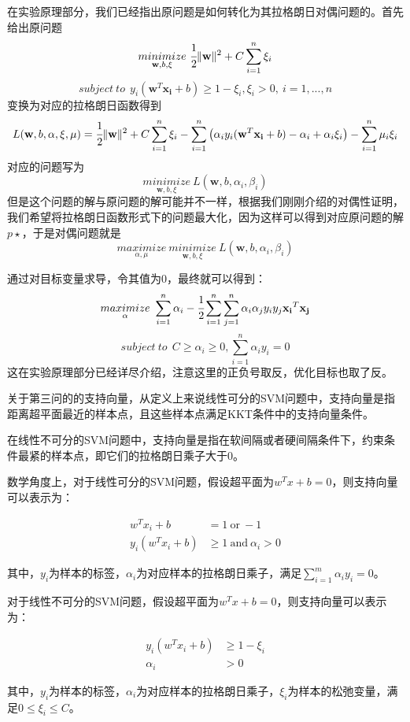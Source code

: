 \documentclass{article}
\begin{document}
在实验原理部分，我们已经指出原问题是如何转化为其拉格朗日对偶问题的。首先给出原问题
$$\underset{\mathbf{w},b,\xi}{minimize} \ \cfrac{1}{2} \lVert \mathbf{w} \rVert^2+C\sum_{i=1}^{n}\xi_i$$
$$ subject\ to\ \  y_i(\mathbf{w}^T\mathbf{x_i}+b)\geq1-\xi_i, \xi_i>0,\ i =1,...,n$$
变换为对应的拉格朗日函数得到
$$L(\mathbf{w},b,\alpha,\xi,\mu)=\cfrac{1}{2} \lVert \mathbf{w} \rVert^2+C\sum_{i=1}^{n}\xi_i-\sum_{i=1}^{n} \left( \alpha_iy_i(\mathbf{w}^T\mathbf{x_i}+b)-\alpha_i+\alpha_i\xi_i\right)-\sum_{i=1}^{n}\mu_i\xi_i$$
对应的问题写为
$$\underset{\mathbf{w},b,\xi}{minimize}\ L(\mathbf{w},b,\alpha_i,\beta_i)$$
但是这个问题的解与原问题的解可能并不一样，根据我们刚刚介绍的对偶性证明，我们希望将拉格朗日函数形式下的问题最大化，因为这样可以得到对应原问题的解$p\star$，于是对偶问题就是
$$\underset{\alpha,\mu}{maximize}\ \underset{\mathbf{w},b,\xi}{minimize}\  L(\mathbf{w},b,\alpha_i,\beta_i)$$

通过对目标变量求导，令其值为$0$，最终就可以得到：
$$\underset{\alpha}{maximize}\ \sum_{i=1}^n \alpha_i-\cfrac{1}{2}\sum_{i=1}^n \sum_{j=1}^n\alpha_i\alpha_jy_iy_j\mathbf{x_i}^T\mathbf{x_j}$$
$$ subject\ to\ \  C\geq \alpha_i \geq 0, \sum_{i=1}^n \alpha_iy_i=0$$
这在实验原理部分已经详尽介绍，注意这里的正负号取反，优化目标也取了反。

关于第三问的的支持向量，从定义上来说线性可分的SVM问题中，支持向量是指距离超平面最近的样本点，且这些样本点满足KKT条件中的支持向量条件。

在线性不可分的SVM问题中，支持向量是指在软间隔或者硬间隔条件下，约束条件最紧的样本点，即它们的拉格朗日乘子大于0。

数学角度上，对于线性可分的SVM问题，假设超平面为$w^Tx+b=0$，则支持向量可以表示为：

$$\begin{aligned} w^Tx_i+b&=1 \ \text{or} \ -1 \\ y_i(w^Tx_i+b)&\geq 1 \ \text{and} \ \alpha_i>0 \end{aligned}$$

其中，$y_i$为样本的标签，$\alpha_i$为对应样本的拉格朗日乘子，满足$\sum\limits_{i=1}^{m}\alpha_iy_i=0$。

对于线性不可分的SVM问题，假设超平面为$w^Tx+b=0$，则支持向量可以表示为：

$$\begin{aligned} y_i(w^Tx_i+b)& \geq 1-\xi_i \\ \alpha_i&>0 \end{aligned}$$

其中，$y_i$为样本的标签，$\alpha_i$为对应样本的拉格朗日乘子，$\xi_i$为样本的松弛变量，满足$0\leq \xi_i \leq C$。
\end{document}
